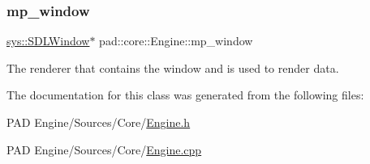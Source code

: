 \subsubsection{\texorpdfstring{mp\+\_\+window}{mp\_window}}
{\footnotesize\ttfamily \mbox{\hyperlink{classpad_1_1sys_1_1_s_d_l_window}{sys\+::\+S\+D\+L\+Window}}$\ast$ pad\+::core\+::\+Engine\+::mp\+\_\+window\hspace{0.3cm}{\ttfamily [private]}}

The renderer that contains the window and is used to render data. 

The documentation for this class was generated from the following files\+:\begin{DoxyCompactItemize}
\item 
P\+A\+D Engine/\+Sources/\+Core/\mbox{\hyperlink{_engine_8h}{Engine.\+h}}\item 
P\+A\+D Engine/\+Sources/\+Core/\mbox{\hyperlink{_engine_8cpp}{Engine.\+cpp}}\end{DoxyCompactItemize}
